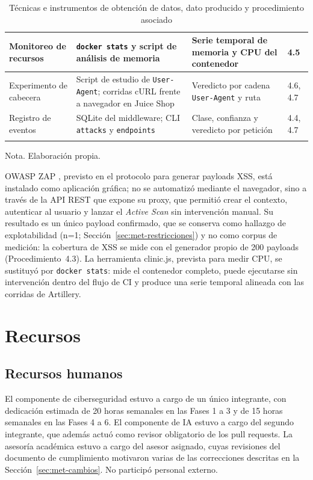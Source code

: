 \begin{longtable}{|L{2.7cm}|L{3.7cm}|L{3.6cm}|L{2.6cm}|}
Monitoreo de recursos & \texttt{docker stats} y script de análisis de memoria & Serie temporal de memoria y CPU del contenedor & 4.5 \\ \hline
Experimento de cabecera & Script de estudio de \texttt{User-Agent}; corridas cURL frente a
navegador en Juice Shop & Veredicto por cadena \texttt{User-Agent} y ruta & 4.6, 4.7 \\ \hline
Registro de eventos & SQLite del middleware; CLI \texttt{attacks} y \texttt{endpoints} & Clase,
confianza y veredicto por petición & 4.4, 4.7 \\ \hline
\caption[Técnicas e instrumentos de obtención de datos]{Técnicas e instrumentos de obtención de datos, dato producido y procedimiento asociado}
\label{tab:met-instrumentos}
\end{longtable}
{\footnotesize Nota. Elaboración propia.}

OWASP ZAP \cite{owaspzap}, previsto en el protocolo para generar payloads XSS, está instalado como
aplicación gráfica; no se automatizó mediante el navegador, sino a través de la API REST que expone
su proxy, que permitió crear el contexto, autenticar al usuario y lanzar el \textit{Active Scan}
sin intervención manual. Su resultado es un único payload confirmado, que se conserva como hallazgo de explotabilidad
(n=1; Sección~\ref{sec:met-restricciones}) y no como corpus de medición: la cobertura de XSS se mide
con el generador propio de 200 payloads (Procedimiento~4.3). La herramienta
clinic.js, prevista para medir CPU, se sustituyó por \texttt{docker stats}: mide el contenedor
completo, puede ejecutarse sin intervención dentro del flujo de CI y produce una serie temporal
alineada con las corridas de Artillery.

\section{Recursos}
\label{sec:met-recursos}

\subsection{Recursos humanos}
El componente de ciberseguridad estuvo a cargo de un único integrante, con dedicación estimada
de 20 horas semanales en las Fases 1 a 3 y de 15 horas semanales en las Fases 4 a 6. El
componente de IA estuvo a cargo del segundo integrante, que además actuó como revisor obligatorio
de los pull requests. La asesoría académica estuvo a cargo del asesor asignado, cuyas revisiones
del documento de cumplimiento motivaron varias de las correcciones descritas en la
Sección~\ref{sec:met-cambios}. No participó personal externo.

